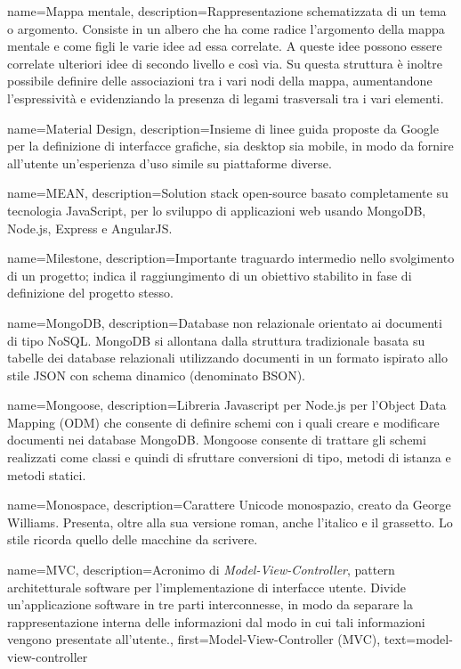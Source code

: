 {
name={Mappa mentale},
description={Rappresentazione schematizzata di un tema o argomento. Consiste in un albero che ha come radice l’argomento della mappa mentale e come figli le varie idee ad essa correlate. A queste idee possono essere correlate ulteriori idee di secondo livello e così via. Su questa struttura è inoltre possibile definire delle associazioni tra i vari nodi della mappa, aumentandone l’espressività e evidenziando la presenza di legami trasversali tra i vari elementi.}
}

{
name={Material Design},
description={Insieme di linee guida proposte da Google per la definizione di interfacce grafiche, sia desktop sia mobile, in modo da fornire all'utente un'esperienza d'uso simile su piattaforme diverse.}
}

{
name={MEAN},
description={Solution stack open-source basato completamente su tecnologia JavaScript, per lo sviluppo di applicazioni web usando MongoDB, Node.js, Express e AngularJS.}
}

{
name={Milestone},
description={Importante traguardo intermedio nello svolgimento di un progetto; indica il raggiungimento di un obiettivo stabilito in fase di definizione del progetto stesso.}
}

{
name={MongoDB},
description={Database non relazionale orientato ai documenti di tipo NoSQL. MongoDB si allontana dalla struttura tradizionale basata su tabelle dei database relazionali utilizzando documenti in un formato ispirato allo stile JSON con schema dinamico (denominato BSON).
}
}

{
name={Mongoose},
description={Libreria Javascript per Node.js per l’Object Data Mapping (ODM) che consente di definire schemi con i quali creare e modificare documenti nei database MongoDB. Mongoose consente di trattare gli schemi realizzati come classi e quindi di sfruttare conversioni di tipo, metodi di istanza e metodi statici.}
}

{
name={Monospace},
description={Carattere Unicode monospazio, creato da George Williams. Presenta, oltre alla sua versione roman, anche l'italico e il grassetto. Lo stile ricorda quello delle macchine da scrivere.}
}

{
name={MVC},
description={Acronimo di \textit{Model-View-Controller}, pattern architetturale software per l'implementazione di interfacce utente. Divide un'applicazione software in tre parti interconnesse, in modo da separare la rappresentazione interna delle informazioni dal modo in cui tali informazioni vengono presentate all'utente.},
first={Model-View-Controller (MVC)},
text={model-view-controller}
}

